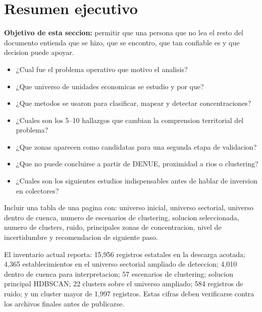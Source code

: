 \documentclass[11pt,letterpaper]{article}
\begin{document}
\section{Resumen ejecutivo}

\textbf{Objetivo de esta seccion:} permitir que una persona que no lea el resto del documento entienda que se hizo, que se encontro, que tan confiable es y que decision puede apoyar.

\begin{preguntas}
\begin{itemize}
    \item ¿Cual fue el problema operativo que motivo el analisis?
    \item ¿Que universo de unidades economicas se estudio y por que?
    \item ¿Que metodos se usaron para clasificar, mapear y detectar concentraciones?
    \item ¿Cuales son los 5--10 hallazgos que cambian la comprension territorial del problema?
    \item ¿Que zonas aparecen como candidatas para una segunda etapa de validacion?
    \item ¿Que no puede concluirse a partir de DENUE, proximidad a rios o clustering?
    \item ¿Cuales son los siguientes estudios indispensables antes de hablar de inversion en colectores?
\end{itemize}
\end{preguntas}

\begin{evidencia}
Incluir una tabla de una pagina con: universo inicial, universo sectorial, universo dentro de cuenca, numero de escenarios de clustering, solucion seleccionada, numero de clusters, ruido, principales zonas de concentracion, nivel de incertidumbre y recomendacion de siguiente paso.
\end{evidencia}

\begin{hechos}
El inventario actual reporta: 15,956 registros estatales en la descarga acotada; 4,365 establecimientos en el universo sectorial ampliado de deteccion; 4,010 dentro de cuenca para interpretacion; 57 escenarios de clustering; solucion principal HDBSCAN; 22 clusters sobre el universo ampliado; 584 registros de ruido; y un cluster mayor de 1,997 registros. Estas cifras deben verificarse contra los archivos finales antes de publicarse.
\end{hechos}
\end{document}
